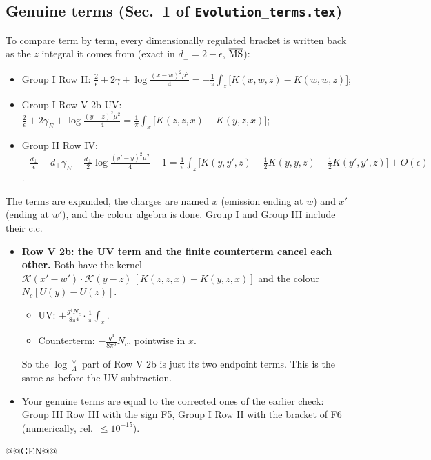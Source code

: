 \documentclass[10pt]{article}
\numberwithin{equation}{section}
\begin{document}
\subsection{Genuine terms (Sec.~1 of \texttt{Evolution\_terms.tex})}\label{sec:gen}
To compare term by term, every dimensionally regulated bracket is written back as the $z$ integral it comes from (exact in $d_\perp=2-\epsilon$, $\overline{\rm MS}$):
\begin{itemize}
\item Group I Row II: $\frac{2}{\epsilon}+2\gamma+\log\frac{(x-w)^2\mu^2}{4}=-\frac1\pi\int_z\big[K(x,w,z)-K(w,w,z)\big]$;
\item Group I Row V 2b UV: $\frac{2}{\epsilon}+2\gamma_E+\log\frac{(y-z)^2\mu^2}{4}=\frac1\pi\int_x\big[K(z,z,x)-K(y,z,x)\big]$;
\item Group II Row IV: $-\frac{d_\perp}{\epsilon}-d_\perp\gamma_E-\frac{d_\perp}{2}\log\frac{(y'-y)^2\mu^2}{4}-1=\frac1\pi\int_z\big[K(y,y',z)-\frac12K(y,y,z)-\frac12K(y',y',z)\big]+O(\epsilon)$.
\end{itemize}
The terms are expanded, the charges are named $x$ (emission ending at $w$) and $x'$ (ending at $w'$), and the colour algebra is done. Group I and Group III include their c.c.
\begin{itemize}
\item \textbf{Row V 2b: the UV term and the finite counterterm cancel each other.} Both have the kernel $\mathcal K(x'-w')\cdot\mathcal K(y-z)\,[K(z,z,x)-K(y,z,x)]$ and the colour $N_c[U(y)-U(z)]$.
\begin{itemize}
\item UV: $+\frac{g^4N_c}{8\pi^4}\cdot\frac1\pi\int_x$.
\item Counterterm: $-\frac{g^4}{8\pi^5}N_c$, pointwise in $x$.
\end{itemize}
So the $\log\frac{\vee}{\Lambda}$ part of Row V 2b is just its two endpoint terms. This is the same as before the UV subtraction.
\item Your genuine terms are equal to the corrected ones of the earlier check: Group III Row III with the sign F5, Group I Row II with the bracket of F6 (numerically, rel.\ $\le10^{-15}$).
\end{itemize}
@@GEN@@
\end{document}
